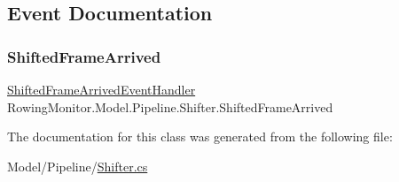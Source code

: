 \subsection{Event Documentation}
\mbox{\label{class_rowing_monitor_1_1_model_1_1_pipeline_1_1_shifter_afd44d987e237cb912776101166c9f14f}} 
\subsubsection{\texorpdfstring{Shifted\+Frame\+Arrived}{ShiftedFrameArrived}}
{\footnotesize\ttfamily \hyperlink{class_rowing_monitor_1_1_model_1_1_pipeline_1_1_shifter_a348927ce21661a1658060d083a91bd61}{Shifted\+Frame\+Arrived\+Event\+Handler} Rowing\+Monitor.\+Model.\+Pipeline.\+Shifter.\+Shifted\+Frame\+Arrived}



The documentation for this class was generated from the following file\+:\begin{DoxyCompactItemize}
\item 
Model/\+Pipeline/\hyperlink{_shifter_8cs}{Shifter.\+cs}\end{DoxyCompactItemize}

